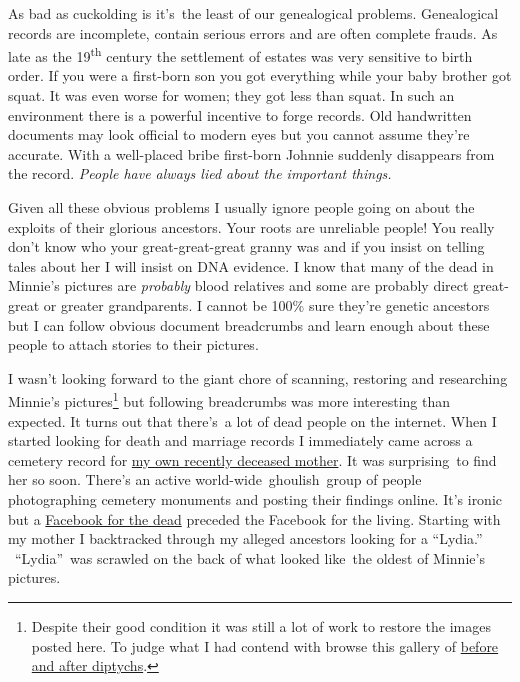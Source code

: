 As bad as cuckolding is it's~the least of our genealogical problems.
Genealogical records are incomplete, contain serious errors and are
often complete frauds. As late as the 19\textsuperscript{th} century the
settlement of estates was very sensitive to birth order. If you were a
first-born son you got everything while your baby brother got squat. It
was even worse for women; they got less than squat. In such an
environment there is a powerful incentive to forge records. Old
handwritten documents may look official to modern eyes but you cannot
assume they're accurate. With a well-placed bribe first-born Johnnie
suddenly disappears from the record. \emph{People have always lied about
the important things.}

Given all these obvious problems I usually ignore people going on about
the exploits of their glorious ancestors. Your roots are unreliable
people! You really don't know who your great-great-great granny was and
if you insist on telling tales about her I will insist on DNA evidence.
I know that many of the dead in Minnie's pictures are \emph{probably}
blood relatives and some are probably direct great-great or greater
grandparents. I cannot be 100\% sure they're genetic ancestors but I can
follow obvious document breadcrumbs and learn enough about these people
to attach stories to their pictures.

I wasn't looking forward to the giant chore of scanning, restoring and
researching Minnie's pictures\footnote{
Despite their good condition it was still a lot of work to restore the
images posted here. To judge what I had contend with browse this
gallery of  \href{http://conceptcontrol.smugmug.com/Themes/Manipulations/Restorations-1}{before
and after diptychs}.
}  but
following breadcrumbs was more interesting than expected. It turns out
that there's~a lot of dead people on the internet. When I started
looking for death and marriage records I immediately came across a
cemetery record for
\href{http://www.findagrave.com/cgi-bin/fg.cgi?page=gr\&GSln=baker\&GSfn=evelyn+\&GSmn=v\&GSbyrel=all\&GSdyrel=all\&GSst=28\&GScnty=1627\&GScntry=4\&GSob=n\&GRid=110246189\&df=all\&}{my
own recently deceased mother}. It was surprising~to find her so soon.
There's an active world-wide~ghoulish~group of people photographing
cemetery monuments and posting their findings online. It's ironic but a
\href{http://en.wikipedia.org/wiki/Find\_a\_Grave}{Facebook for the
dead} preceded the Facebook for the living. Starting with my mother I
backtracked through my alleged ancestors looking for a ``Lydia.''
~``Lydia''~was scrawled on the back of what looked like~the oldest of
Minnie's pictures.


